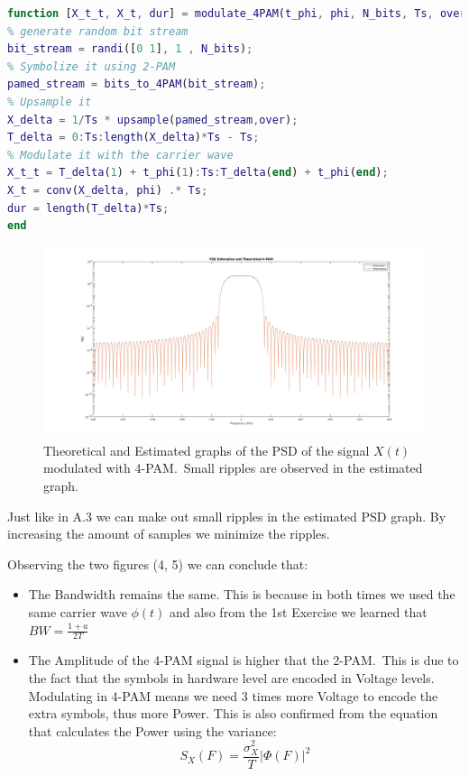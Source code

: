 \documentclass[12pt, a4paper]{article}
\begin{document}
\begin{enumerate}
\begin{enumerate}
\begin{lstlisting}[language=MATLAB]
function [X_t_t, X_t, dur] = modulate_4PAM(t_phi, phi, N_bits, Ts, over)
% generate random bit stream
bit_stream = randi([0 1], 1 , N_bits);
% Symbolize it using 2-PAM
pamed_stream = bits_to_4PAM(bit_stream);
% Upsample it
X_delta = 1/Ts * upsample(pamed_stream,over);
T_delta = 0:Ts:length(X_delta)*Ts - Ts;
% Modulate it with the carrier wave
X_t_t = T_delta(1) + t_phi(1):Ts:T_delta(end) + t_phi(end);
X_t = conv(X_delta, phi) .* Ts;
dur = length(T_delta)*Ts;
end
        \end{lstlisting}
        \begin{figure}[H]
            \centering
            \noindent\includegraphics[width=\textwidth]{PSD_EST_THE_4PAM.png}
            \caption{Theoretical and Estimated graphs of the PSD of the signal \(X(t)\) modulated with 4-PAM.\
            Small ripples are observed in the estimated graph.}
        \end{figure}

		Just like in A.3 we can make out small ripples in the estimated PSD graph. By increasing the amount of samples we minimize the ripples.
		
        Observing the two figures (4, 5) we can conclude that:
        \begin{itemize}
            \item The Bandwidth remains the same. This is because in both times we used the same carrier wave \(\phi(t)\) and also from the 1st Exercise we
            learned that \(BW = \frac{1+a}{2T}\)
            \item The Amplitude of the 4-PAM signal is higher that the 2-PAM.\ This is due to the fact that the symbols in hardware level
            are encoded in Voltage levels. Modulating in 4-PAM means we need 3 times more Voltage to encode the extra symbols, thus more Power. This is 
            also confirmed from the equation that calculates the Power using the variance:
            \[S_X(F) = \frac{\sigma_X^2}{T} |\Phi(F)|^2 \]
          \end{itemize}


\end{enumerate}
\end{enumerate}
\end{document}
